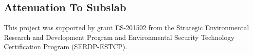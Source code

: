 \documentclass[journal=esthag,manuscript=article]{achemso}
\begin{document}
\subsection{Attenuation To Subslab} %





\begin{acknowledgement}
  This project was supported by grant ES-201502 from the Strategic Environmental Research and Development Program and Environmental Security Technology Certification Program (SERDP-ESTCP).
\end{acknowledgement}


\end{document}

